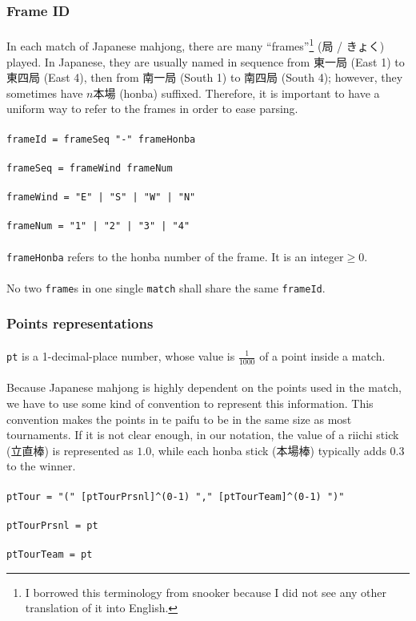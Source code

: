 \documentclass[%
	a4paper%
	,10pt%
	,twoside%
	,notitlepage%
]{article}%
\newcommand*{\ruleSymbol}{\textjapanese{⚠}}%
\newcommand*{\ruleMargin}{\marginpar{\flushright{}\ruleSymbol{}}}%
\newcommand*{\rulePar}{\paragraph*{\ruleMargin{}}}%
\begin{document}
		\subsubsection{Frame ID}\label{subsubsec:frameid}%
			\paragraph*{}In each match of Japanese mahjong, there are many ``frames''\footnote{I borrowed this terminology from snooker because I did not see any other translation of it into English. } (\textjapanese{局} / \textjapanese{きょく}) played. In Japanese, they are usually named in sequence from \textjapanese{東一局} (East 1) to \textjapanese{東四局} (East 4), then from \textjapanese{南一局} (South 1) to \textjapanese{南四局} (South 4); however, they sometimes have $n$\textjapanese{本場} (honba) suffixed. Therefore, it is important to have a uniform way to refer to the frames in order to ease parsing. %
			\rulePar{}\lstinline/frameId = frameSeq "-" frameHonba/%
			\rulePar{}\lstinline/frameSeq = frameWind frameNum/%
			\rulePar{}\lstinline/frameWind = "E" | "S" | "W" | "N"/%
			\rulePar{}\lstinline/frameNum = "1" | "2" | "3" | "4"/%
			\rulePar{}\lstinline/frameHonba/ refers to the honba number of the frame. It is an integer${} \ge 0$. %
			\rulePar{}No two \lstinline/frame/s in one single \lstinline/match/ shall share the same \lstinline/frameId/. %
		\subsubsection{Points representations}\label{subsubsec:pt}%
			\rulePar{}\lstinline/pt/ is a 1-decimal-place number, whose value is $\frac{1}{1000}$ of a point inside a match. %
			\paragraph*{}Because Japanese mahjong is highly dependent on the points used in the match, we have to use some kind of convention to represent this information. This convention makes the points in te paifu to be in the same size as most tournaments. If it is not clear enough, in our notation, the value of a riichi stick (\textjapanese{立直棒}) is represented as $1.0$, while each honba stick (\textjapanese{本場棒}) typically adds $0.3$ to the winner. %
			\rulePar{}\lstinline/ptTour = "(" [ptTourPrsnl]^(0-1) "," [ptTourTeam]^(0-1) ")"/%
			\rulePar{}\lstinline/ptTourPrsnl = pt/%
			\rulePar{}\lstinline/ptTourTeam = pt/%
\end{document}
